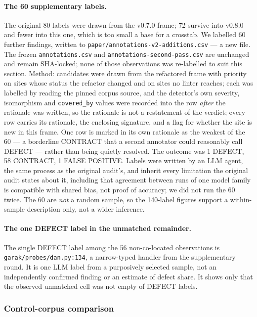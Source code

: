 \documentclass[10pt,a4paper]{article}
\begin{document}
\paragraph{The 60 supplementary labels.} The original 80 labels were drawn from the
v0.7.0 frame; 72 survive into v0.8.0 and fewer into this one, which is too small a
base for a crosstab. We labelled 60 further findings, written to
\texttt{paper/annotations-v2-additions.csv} --- a new file. The frozen
\texttt{annotations.csv} and \texttt{annotations-second-pass.csv} are unchanged and
remain SHA-locked; none of those observations was re-labelled to suit this section. Method:
candidates were drawn from the refactored frame with priority on sites whose status
the refactor changed and on sites no linter reaches; each was labelled by reading
the pinned corpus source, and the detector's own severity, isomorphism and
\texttt{covered\_by} values were recorded into the row \emph{after} the rationale was
written, so the rationale is not a restatement of the verdict; every row carries its
rationale, the enclosing signature, and a flag for whether the site is new in this
frame. One row is marked in its own rationale as the weakest of the 60 --- a
borderline CONTRACT that a second annotator could reasonably call DEFECT --- rather
than being quietly resolved. The outcome was 1 DEFECT, 58 CONTRACT, 1 FALSE
POSITIVE. Labels were written by an LLM agent, the same process as the original audit's, and
inherit every limitation the original audit states about it, including that agreement between runs
of one model family is compatible with shared bias, not proof of accuracy; we did not run the 60
twice. The 60 are \emph{not} a random sample, so the 140-label figures support a
within-sample description only, not a wider inference.

\paragraph{The one DEFECT label in the unmatched remainder.} The single DEFECT
label among the 56 non-co-located observations is
\texttt{garak/probes/dan.py:134}, a narrow-typed handler from the supplementary
round. It is one LLM label from a purposively selected sample, not an independently
confirmed finding or an estimate of defect share. It shows only that the observed
unmatched cell was not empty of DEFECT labels.

\subsubsection{Control-corpus comparison}
\label{sec:control}
\end{document}
